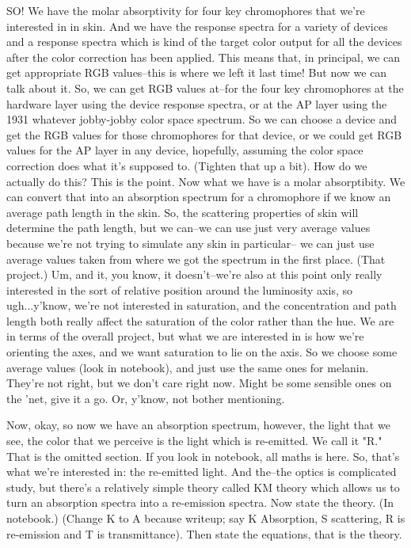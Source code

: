 SO! We have the molar absorptivity for four key chromophores that we're interested in in skin. And we have the response spectra for a variety of devices and a response spectra which is kind of the target color output for all the devices after the color correction has been applied. This means that, in principal, we can get appropriate RGB values--this is where we left it last time! But now we can talk about it. So, we can get RGB values at--for the four key chromophores at the hardware layer using the device response spectra, or at the AP layer using the 1931 whatever jobby-jobby color space spectrum. So we can choose a device and get the RGB values for those chromophores for that device, or we could get RGB values for the AP layer in any device, hopefully, assuming the color space correction does what it's supposed to. (Tighten that up a bit). How do we actually do this? This is the point. Now what we have is a molar absorptibity. We can convert that into an absorption spectrum for a chromophore if we know an average path length in the skin. So, the scattering properties of skin will determine the path length, but we can--we can use just very average values because we're not trying to simulate any skin in particular-- we can just use average values taken from where we got the spectrum in the first place. (That project.) Um, and it, you know, it doesn't--we're also at this point only really interested in the sort of relative position around the luminosity axis, so ugh...y'know, we're not interested in saturation, and the concentration and path length both really affect the saturation of the color rather than the hue. We are in terms of the overall project, but what we are interested in is how we're orienting the axes, and we want saturation to lie on the axis. So we choose some average values (look in notebook), and just use the same ones for melanin. They're not right, but we don't care right now. Might be some sensible ones on the 'net, give it a go. Or, y'know, not bother mentioning.

Now, okay, so now we have an absorption spectrum, however, the light that we see, the color that we perceive is the light which is re-emitted. We call it "R." That is the omitted section. If you look in notebook, all maths is here. So, that's what we're interested in: the re-emitted light. And the--the optics is complicated study, but there's a relatively simple theory called KM theory which allows us to turn an absorption spectra into a re-emission spectra. Now state the theory. (In notebook.) (Change K to A because writeup; say K Absorption, S scattering, R is re-emission and T is transmittance). Then state the equations, that is the theory.

